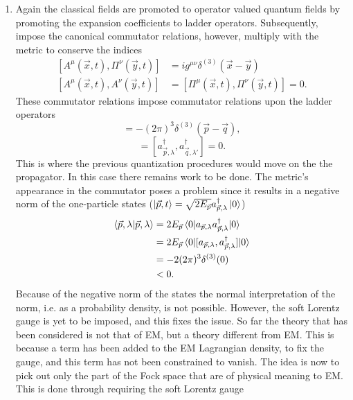 \begin{enumerate}
	\item Again the classical fields are promoted to operator valued quantum fields by promoting the expansion coefficients to ladder operators. Subsequently, impose the canonical commutator relations, however, multiply with the metric to conserve the indices
	\begin{equation}
		\begin{split}
			[A^\mu(\vec{x},t), \Pi^\nu(\vec{y},t)] &= ig^{\mu\nu}\delta^{(3)}(\vec{x}-\vec{y})\\ [A^\mu(\vec{x},t),A^\nu(\vec{y},t)]& = [\Pi^\mu(\vec{x},t),\Pi^\nu(\vec{y},t)]=0.
		\end{split}
	\end{equation} 
	These commutator relations impose commutator relations upon the ladder operators
	\begin{equation}
		[a_{\vec{p},\lambda},a_{\vec{q},\lambda'}^\dagger]=-(2\pi)^3\delta^{(3)}(\vec{p}-\vec{q}),
	\end{equation} 
	\begin{equation}
		[a_{\vec{p},\lambda},a_{\vec{q},\lambda'}]=[a_{\vec{p},\lambda}^\dagger,a_{\vec{q},\lambda'}^\dagger]=0.
	\end{equation} 
	This is where the previous quantization procedures would move on the the propagator. In this case there remains work to be done. The metric's appearance in the commutator poses a problem since it results in a negative norm of the one-particle states ($\ket{\vec{p},t}=\sqrt{2E_{\vec{p}}}a_{\vec{p},\lambda}^\dagger\ket{0}$)
	\begin{equation}
		\begin{split}
			\braket{\vec{p},\lambda|\vec{p},\lambda} &= 2E_{\vec{p}}\braket{0|a_{\vec{p},\lambda}a_{\vec{p},\lambda}^\dagger|0}\\
			&=2E_{\vec{p}}\braket{0|[a_{\vec{p},\lambda},a_{\vec{p},\lambda}^\dagger]|0}\\
			&=-2(2\pi)^3\delta^{(3)}(0)\\
			&<0.
		\end{split}
	\end{equation}  
	Because of the negative norm of the states the normal interpretation of the norm, i.e. as a probability density, is not possible. However, the soft Lorentz gauge is yet to be imposed, and this fixes the issue. So far the theory that has been considered is not that of EM, but a theory different from EM. This is because a term has been added to the EM Lagrangian density, to fix the gauge, and this term has not been constrained to vanish. The idea is now to pick out only the part of the Fock space that are of physical meaning to EM. This is done through requiring the soft Lorentz gauge

\end{enumerate}
